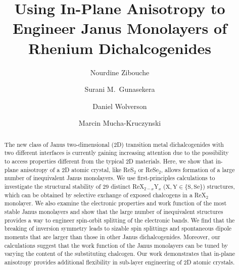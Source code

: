 \documentclass[reprint, superscriptaddress, amsmath,amssymb,prb,twocolumn]{revtex4-2}
\begin{document}

\title{Using In-Plane Anisotropy to Engineer Janus Monolayers of Rhenium Dichalcogenides}
\author{Nourdine Zibouche}
\author{Surani M.~Gunasekera}
\author{Daniel Wolverson}
\author{Marcin Mucha-Kruczynski}


\begin{abstract}
The new class of Janus two-dimensional (2D) transition metal dichalcogenides with two different interfaces is currently gaining increasing attention due to the possibility to access properties different from the typical 2D materials. Here, we show that in-plane anisotropy of a 2D atomic crystal, like ReS$_{2}$ or ReSe$_{2}$, allows formation of a large number of inequivalent Janus monolayers. We use first-principles calculations to investigate the structural stability of 29 distinct ReX$_{2-x}$Y$_{x}$ ($\mathrm{X,Y \in  \{S,Se\}}$) structures, which can be obtained by selective exchange of exposed chalcogens in a ReX$_{2}$ monolayer. We also examine the electronic properties and work function of the most stable Janus monolayers and show that the large number of inequivalent structures provides a way to engineer spin-orbit splitting of the electronic bands. We find that the breaking of inversion symmetry leads to sizable spin splittings and spontaneous dipole moments that are larger than those in other Janus dichalcogenides. Moreover, our calculations suggest that the work function of the Janus monolayers can be tuned by varying the content of the substituting chalcogen. Our work demonstrates that in-plane anisotropy provides additional flexibility in sub-layer engineering of 2D atomic crystals.
\end{abstract}
\end{document}
